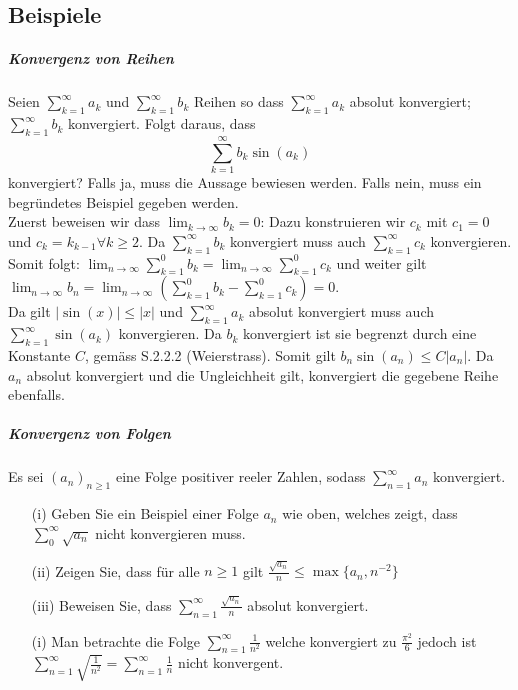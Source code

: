 \documentclass[7pt,landscape, margin = 0.1mm]{article}
\begin{document}
\begin{multicols}{4}
\begin{flushleft}
\begin{flushleft}
\subsection{Beispiele}
\vspace{1mm} \hline \vspace{3mm}
\subparagraph{Konvergenz von Reihen}
Seien $\sum_{k=1}^{\infty} a_k$ und $\sum_{k=1}^{\infty} b_k$ Reihen so dass $\sum_{k=1}^{\infty} a_k$ absolut konvergiert; $\sum_{k=1}^{\infty} b_k$ konvergiert.
Folgt daraus, dass
$$
\sum_{k=1}^{\infty} b_k \sin \left(a_k\right)
$$
konvergiert? Falls ja, muss die Aussage bewiesen werden. Falls nein, muss ein begründetes Beispiel gegeben werden.
\\
Zuerst beweisen wir dass $\lim_{k\to \infty}b_k = 0$:
Dazu konstruieren wir $c_k$ mit $c_1=0$ und $c_k = k_{k-1} \forall k\geq 2$. Da $\sum_{k=1}^{\infty} b_k$ konvergiert muss auch $\sum_{k=1}^{\infty} c_k$ konvergieren. Somit folgt:
$\lim_{n \to \infty}\sum_{k=1}^{0} b_k = \lim_{n \to \infty}\sum_{k=1}^{0} c_k $ und weiter gilt $\lim_{n \to \infty} b_n = \lim_{n \to \infty} \left(\sum_{k=1}^{0} b_k - \sum_{k=1}^{0} c_k  \right)=0$.\\
Da gilt $|\sin(x)| \leq |x|$ und $\sum_{k=1}^{\infty} a_k$ absolut konvergiert muss auch $\sum_{k=1}^{\infty}  \sin(a_k)$ konvergieren. Da $b_k$ konvergiert ist sie begrenzt durch eine Konstante $C$, gemäss S.2.2.2 (Weierstrass). Somit gilt $b_n \sin(a_n) \leq C |a_n|$. Da $a_n$ absolut konvergiert und die Ungleichheit gilt, konvergiert die gegebene Reihe ebenfalls.
\vspace{1mm} \hline \vspace{1mm}
\subparagraph{Konvergenz von Folgen}
Es sei $(a_n)_{n\geq 1}$ eine Folge positiver reeler Zahlen, sodass $\sum_{n=1}^{\infty} a_n$ konvergiert.
\begin{itemize}
\item[(i)] Geben Sie ein Beispiel einer Folge $a_n$ wie oben, welches zeigt, dass $\sum_{0}^{\infty} \sqrt{a_n}$ nicht konvergieren muss.
\item[(ii)] Zeigen Sie, dass für alle $n \geq 1$ gilt $\frac{\sqrt{a_n}}{n} \leq \operatorname{max}\{a_n, n^{-2}\}$
\item[(iii)] Beweisen Sie, dass $\sum_{n=1}^{\infty} \frac{\sqrt{a_n}}{n}$ absolut konvergiert.
\end{itemize}
\begin{itemize}
\item[(i)] Man betrachte die Folge $\sum_{n=1}^{\infty} \frac{1}{n^2}$ welche konvergiert zu $\frac{\pi^2}{6}$ jedoch ist $\sum_{n=1}^{\infty} \sqrt{\frac{1}{n^2}} =\sum_{n=1}^{\infty}  \frac{1}{n}  $ nicht konvergent.

\end{itemize}
\end{flushleft}
\end{flushleft}
\end{multicols}
\end{document}
